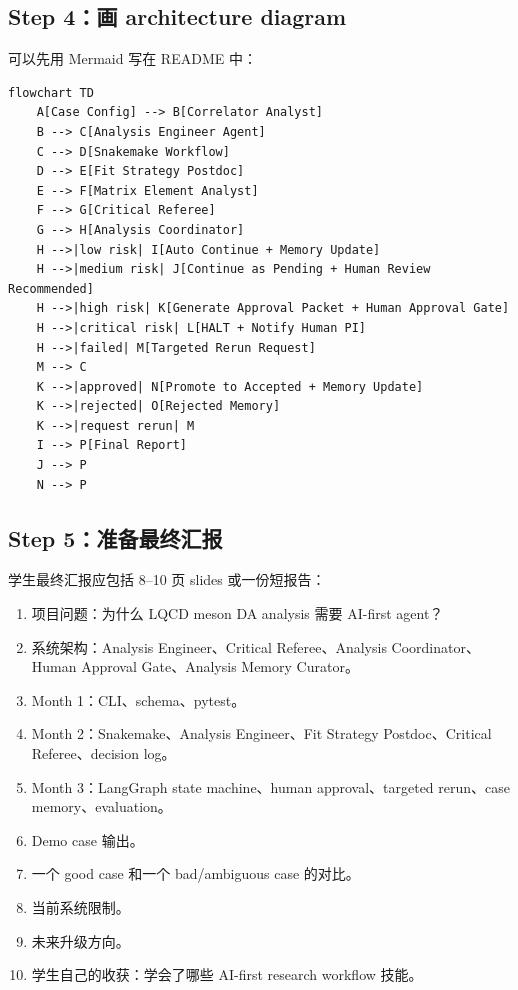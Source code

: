 \documentclass[11pt,a4paper,fontset=none]{ctexart}
\begin{document}
\subsection{Step 4：画 architecture diagram}

可以先用 Mermaid 写在 README 中：

\begin{lstlisting}
flowchart TD
    A[Case Config] --> B[Correlator Analyst]
    B --> C[Analysis Engineer Agent]
    C --> D[Snakemake Workflow]
    D --> E[Fit Strategy Postdoc]
    E --> F[Matrix Element Analyst]
    F --> G[Critical Referee]
    G --> H[Analysis Coordinator]
    H -->|low risk| I[Auto Continue + Memory Update]
    H -->|medium risk| J[Continue as Pending + Human Review Recommended]
    H -->|high risk| K[Generate Approval Packet + Human Approval Gate]
    H -->|critical risk| L[HALT + Notify Human PI]
    H -->|failed| M[Targeted Rerun Request]
    M --> C
    K -->|approved| N[Promote to Accepted + Memory Update]
    K -->|rejected| O[Rejected Memory]
    K -->|request rerun| M
    I --> P[Final Report]
    J --> P
    N --> P
\end{lstlisting}

\subsection{Step 5：准备最终汇报}

学生最终汇报应包括 8--10 页 slides 或一份短报告：

\begin{enumerate}[leftmargin=2em]
  \item 项目问题：为什么 LQCD meson DA analysis 需要 AI-first agent？
  \item 系统架构：Analysis Engineer、Critical Referee、Analysis Coordinator、Human Approval Gate、Analysis Memory Curator。
  \item Month 1：CLI、schema、pytest。
  \item Month 2：Snakemake、Analysis Engineer、Fit Strategy Postdoc、Critical Referee、decision log。
  \item Month 3：LangGraph state machine、human approval、targeted rerun、case memory、evaluation。
  \item Demo case 输出。
  \item 一个 good case 和一个 bad/ambiguous case 的对比。
  \item 当前系统限制。
  \item 未来升级方向。
  \item 学生自己的收获：学会了哪些 AI-first research workflow 技能。
\end{enumerate}
\end{document}
